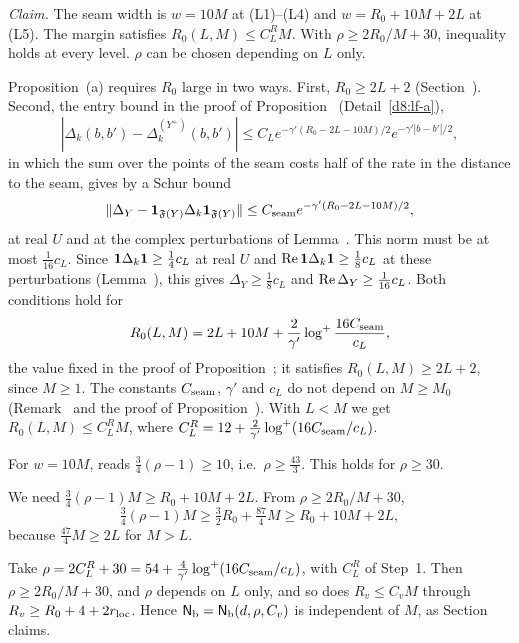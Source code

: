 \begin{detail}\label{d9:rho}
\emph{Claim.} The seam width is $w=10M$ at (L1)--(L4) and $w=R_0+10M+2L$ at (L5). The margin satisfies $R_0(L,M)\le C^{R}_LM$. With $\rho\ge 2R_0/M+30$, inequality  holds at every level. $\rho$ can be chosen depending on $L$ only.
\begin{step}[$R_0(L,M)$]
Proposition~(a) requires $R_0$ large in two ways. First, $R_0\ge 2L+2$ (Section~). Second, the entry bound in the proof of Proposition~ (Detail~\ref{d8:lf-a}),
\[
|\Delta_k(b,b')-\Delta^{(Y^+)}_k(b,b')|\le C_Le^{-\gamma'(R_0-2L-10M)/2}e^{-\gamma'|b-b'|/2},
\]
in which the sum over the points of the seam costs half of the rate in the distance to the seam, gives by a Schur bound
\[
\|\Delta_Y-\mathbf 1_{\mathfrak F(Y)}\Delta_k\mathbf 1_{\mathfrak F(Y)}\|\le C_{\rm seam}e^{-\gamma'(R_0-2L-10M)/2},
\]
at real $U$ and at the complex perturbations of Lemma~. This norm must be at most $\frac1{16}c_L$. Since $\mathbf 1\Delta_k\mathbf 1\ge\frac14c_L$ at real $U$ and $\operatorname{Re}\mathbf 1\Delta_k\mathbf 1\ge\frac18c_L$ at these perturbations (Lemma~), this gives $\Delta_Y\ge\frac18c_L$ and $\operatorname{Re}\Delta_Y\ge\frac1{16}c_L$. Both conditions hold for
\[
R_0(L,M)=2L+10M+\frac2{\gamma'}\log^+\frac{16C_{\rm seam}}{c_L},
\]
the value fixed in the proof of Proposition~; it satisfies $R_0(L,M)\ge2L+2$, since $M\ge1$. The constants $C_{\rm seam}$, $\gamma'$ and $c_L$ do not depend on $M\ge M_0$ (Remark~ and the proof of Proposition~). With $L<M$ we get $R_0(L,M)\le C^{R}_LM$, where $C^{R}_L=12+\frac2{\gamma'}\log^+(16C_{\rm seam}/c_L)$.
\end{step}
\begin{step}[(L1)--(L4)]
For $w=10M$,  reads $\frac34(\rho-1)\ge10$, i.e.\ $\rho\ge\frac{43}3$. This holds for $\rho\ge30$.
\end{step}
\begin{step}[(L5)]
We need $\frac34(\rho-1)M\ge R_0+10M+2L$. From $\rho\ge2R_0/M+30$,
\[
\tfrac34(\rho-1)M\ge\tfrac32R_0+\tfrac{87}4M\ge R_0+10M+2L,
\]
because $\frac{47}4M\ge2L$ for $M>L$.
\end{step}
\begin{step}[Order]
Take $\rho=2C^{R}_L+30=54+\frac4{\gamma'}\log^+(16C_{\rm seam}/c_L)$, with $C^{R}_L$ of Step~1. Then $\rho\ge2R_0/M+30$, and $\rho$ depends on $L$ only, and so does $R_v\le C_vM$ through $R_v\ge R_0+4+2r_{\rm loc}$. Hence $\mathsf N_{\rm b}=\mathsf N_{\rm b}(d,\rho,C_v)$ is independent of $M$, as Section~ claims.
\end{step}
\end{detail}

